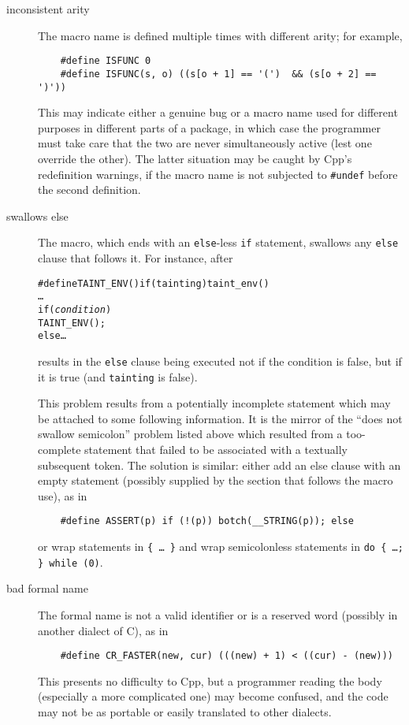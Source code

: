 \documentclass[10pt]{article}
\begin{document}
\begin{description}
\item[inconsistent arity]
        The macro name is defined multiple times with different arity; for example,
\begin{verbatim}
    #define ISFUNC 0
    #define ISFUNC(s, o) ((s[o + 1] == '(')  && (s[o + 2] == ')'))
\end{verbatim}
        This may indicate either a genuine bug or a macro name used for
        different purposes in different parts of a package, in which case
        the programmer must take care that the two are never simultaneously
        active (lest one override the other).  The latter situation may be
        caught by Cpp's redefinition warnings, if the macro name is not
        subjected to {\tt \#undef} before the second definition.

\item[swallows else]
        The macro, which ends with an {\tt else}-less {\tt if} statement,
        swallows any {\tt else} clause that follows it.  For instance, after
\begin{alltt}
    #define TAINT_ENV() if (tainting) taint_env()
    \ldots
    if ({\rm\em{}condition})
      TAINT_ENV();
    else \ldots
\end{alltt}
        results in the {\tt else} clause being executed not if  the
        condition is false, but if it is true (and {\tt tainting} is false).
        
        This problem results from a potentially incomplete statement which
        may be attached to some following information.  It is the mirror of
        the ``does not swallow semicolon'' problem listed above which
        resulted from a too-complete statement that failed to be
        associated with a textually subsequent token.  The solution is
        similar: either add an else clause with an empty statement
        (possibly supplied by the section that follows the macro use), as in
\begin{verbatim}
    #define ASSERT(p) if (!(p)) botch(__STRING(p)); else
\end{verbatim}
        or wrap statements in {\tt \verb|{| \ldots\ \verb|}|} and wrap
        semicolonless statements in {\tt do \verb|{| {\rm \ldots}\verb|; }| while
        (0)}.

\item[bad formal name]
        The formal name is not a valid identifier or is a reserved word
        (possibly in another dialect of C), as in
\begin{verbatim}
    #define CR_FASTER(new, cur) (((new) + 1) < ((cur) - (new)))
\end{verbatim}
        This presents no difficulty to Cpp, but a programmer reading the
        body (especially a more complicated one) may become confused, and
        the code may not be as portable or easily translated to other
        dialects.

\end{description}
\end{document}
